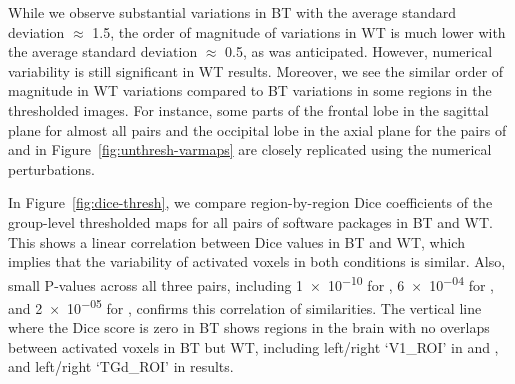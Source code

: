 \documentclass[conference]{IEEEtran}
\begin{document}
While we observe substantial variations in BT with the average standard deviation $\approx$ 1.5,
the order of magnitude of variations in WT is much lower with the average standard deviation $\approx$ 0.5,
as was anticipated. However, numerical variability is still significant in WT results.
Moreover, we see the similar order of magnitude in WT variations compared to BT variations
in some regions in the thresholded images.
For instance, some parts of the frontal lobe in the sagittal plane for almost all pairs and the occipital lobe in the axial plane
for the pairs of \fslspm and \fslafni in Figure~\ref{fig:unthresh-varmaps}
are closely replicated using the numerical perturbations. 

In Figure~\ref{fig:dice-thresh}, we compare region-by-region Dice coefficients of
the group-level thresholded maps for all pairs of software packages in BT and WT.
This shows a linear correlation between Dice values in BT and WT,
which implies that the variability of activated voxels in both conditions is similar.
Also, small P-values across all three pairs, including \num{1e-10} for \fslafni, \num{6e-04} for \fslspm,
and \num{2e-05} for \afnispm, confirms this correlation of similarities.
The vertical line where the Dice score is zero in BT shows regions in the brain with no overlaps between activated voxels in BT but WT,
including left/right `V1\_ROI' in \fslafni and \fslspm, and left/right `TGd\_ROI' in \afnispm results.
\end{document}
